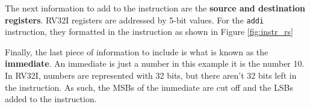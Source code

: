         
The next information to add to the instruction are the \textbf{source and destination registers}. RV32I registers are addressed by 5-bit values. For the \texttt{addi} instruction, they formatted in the instruction as shown in Figure \ref{fig:instr_rs}


Finally, the last piece of information to include is what is known as the \textbf{immediate}. An immediate is just a number \- in this example it is the number 10. In RV32I, numbers are represented with 32 bits, but there aren't 32 bits left in the instruction. As such, the \glspl{MSB} of the immediate are cut off and the \glspl{LSB} added to the instruction.